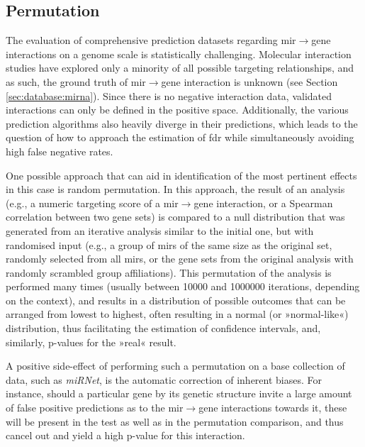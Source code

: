 \begin{method}

\subsection{Permutation}
The evaluation of comprehensive prediction datasets regarding \ac{mir}$\to$gene interactions on a genome scale is statistically challenging. Molecular interaction studies have explored only a minority of all possible targeting relationships, and as such, the ground truth of \ac{mir}$\to$gene interaction is unknown (see Section \ref{sec:database:mirna}). Since there is no negative interaction data, validated interactions can only be defined in the positive space. Additionally, the various prediction algorithms also heavily diverge in their predictions, which leads to the question of how to approach the estimation of \acf{fdr} while simultaneously avoiding high false negative rates.

One possible approach that can aid in identification of the most pertinent effects in this case is random permutation. In this approach, the result of an analysis (e.g., a numeric targeting score of a \ac{mir}$\to$gene interaction, or a Spearman correlation between two gene sets) is compared to a null distribution that was generated from an iterative analysis similar to the initial one, but with randomised input (e.g., a group of \acp{mir} of the same size as the original set, randomly selected from all \acp{mir}, or the gene sets from the original analysis with randomly scrambled group affiliations). This permutation of the analysis is performed many times (usually between \num{10000} and \num{1000000} iterations, depending on the context), and results in a distribution of possible outcomes that can be arranged from lowest to highest, often resulting in a normal (or »normal-like«) distribution, thus facilitating the estimation of confidence intervals, and, similarly, p-values for the »real« result.

A positive side-effect of performing such a permutation on a base collection of data, such as \textit{miRNet}, is the automatic correction of inherent biases. For instance, should a particular gene by its genetic structure invite a large amount of false positive predictions as to the \ac{mir}$\to$gene interactions towards it, these will be present in the test as well as in the permutation comparison, and thus cancel out and yield a high p-value for this interaction.


\end{method}
